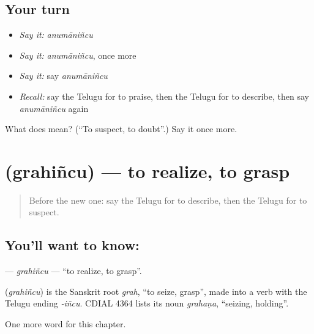 \subsection*{Your turn}
\begin{itemize}
\raggedright
  \item \emph{Say it:} \emph{anumāniñcu}
  \item \emph{Say it:} \emph{anumāniñcu}, once more
  \item \emph{Say it:} say \emph{anumāniñcu}
  \item \emph{Recall:} say the Telugu for to praise, then the Telugu for to describe, then say \emph{anumāniñcu} again
\end{itemize}

\begin{tcolorbox}[breakable,colback=teal!4,colframe=teal!35!black,title={Before you move on}]
What does  mean? (\textquotedblleft{}To suspect, to doubt\textquotedblright{}.) Say it once more.
\end{tcolorbox}
\section[\texorpdfstring{\te{గ్రహించు} (grahiñcu)}{గ్రహించు (grahiñcu)}]{ (grahiñcu) — to realize, to grasp}

\label{lesson:TE-C163-grahincu}



\begin{quote}
Before the new one: say the Telugu for to describe, then the Telugu for to suspect.
\end{quote}

\subsection*{You'll want to know: }
\textbf{} — \emph{grahiñcu} — \textquotedblleft{}to realize, to grasp\textquotedblright{}.

\begin{cousinweb}
\textbf{} (\emph{grahiñcu}) is the Sanskrit root \emph{grah}, \textquotedblleft{}to seize, grasp\textquotedblright{}, made into a verb with the Telugu ending \emph{-iñcu}. CDIAL 4364 lists its noun \emph{grahaṇa}, \textquotedblleft{}seizing, holding\textquotedblright{}.
\end{cousinweb}

\begin{grammarlens}[title={What you've built}]
One more word for this chapter.
\end{grammarlens}

